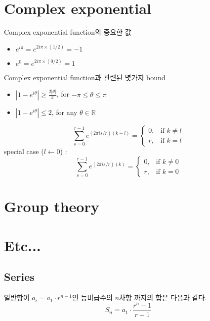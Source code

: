 \documentclass[
]{kaohandt}
\begin{document}
\section{Complex exponential}
\begin{remark}
    Complex exponential function의 중요한 값
    \begin{itemize}
        \item $e^{i \pi} = e^{2i\pi \times (1/2)} = -1$
        \item $e^{0} = e^{2i\pi \times (0/2)} = 1$
    \end{itemize}
\end{remark}

\begin{remark}
    Complex exponential function과 관련된 몇가지 bound
    \begin{itemize}
        \item $|1 - e^{i\theta} | \ge \frac{2 |\theta|}{\pi}$, for $-\pi \le \theta \le \pi$
        \item $|1 - e^{i\theta} | \le 2$, for any $\theta \in \mathbb R$
    \end{itemize}
\end{remark}

\begin{theorem}
    $$\sum_{s=0}^{r-1} e^{(2\pi i s/r)(k-l)} = \begin{cases}
        0, & \text{if } k \ne l\\
        r, & \text{if } k = l
    \end{cases}$$
    special case ($l \leftarrow 0$) : 
    $$\sum_{s=0}^{r-1} e^{(2\pi i s/r)(k)} = \begin{cases}
        0, & \text{if } k \ne 0\\
        r, & \text{if } k = 0
    \end{cases}$$
\end{theorem}

\section{Group theory}

\section{Etc...}
\subsection{Series}
\begin{theorem}[등비 급수]
    일반항이 $a_i = a_1 \cdot r^{n-1}$인 등비급수의 $n$차항 까지의 합은 다음과 같다. 
    $$S_n=a_1 \cdot \frac{r^n-1}{r-1}$$
\end{theorem}
\end{document}
